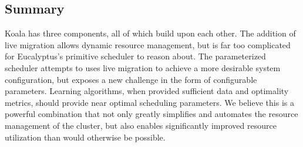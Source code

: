 \subsection{Summary}

Koala has three components, all of which build upon each other.  The addition
of live migration allows dynamic resource management, but is far too
complicated for Eucalyptus's primitive scheduler to reason about.  The
parameterized scheduler attempts to uses live migration to achieve a more
desirable system configuration, but exposes a new challenge in the form of
configurable parameters.  Learning algorithms, when provided sufficient data
and optimality metrics, should provide near optimal scheduling parameters.  We
believe this is a powerful combination that not only greatly simplifies and
automates the resource management of the cluster, but also enables
significantly improved resource utilization than would otherwise be possible.
